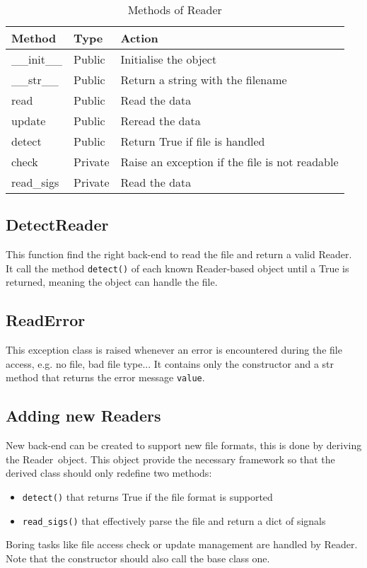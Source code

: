 \documentclass[a4paper,11pt]{article}
\newcommand{\att}[1]{\texttt{#1}}
\newcommand{\meth}[1]{\texttt{#1()}}
\newcommand{\cls}[1]{\textsf{#1}}
\newcommand{\rd}{\cls{Reader}}
\begin{document}
\begin{table}[htbp]
  \centering\sf\small
  \begin{tabular}{lll}
    \hline
    Method & Type & Action \\
    \hline
    \_\_init\_\_ & Public & Initialise the object \\
    \_\_str\_\_  & Public & Return a string with the filename\\
    read         & Public & Read the data\\
    update       & Public & Reread the data\\
    detect       & Public & Return True if file is handled\\
    check        & Private& Raise an exception if the file is not readable\\
    read\_sigs    & Private& Read the data \\
    \hline
  \end{tabular}
  \caption{Methods of \rd}
  \label{tab:rds:meth}
\end{table}

\subsection{DetectReader}
\label{sec:readers:detect}
This function find the right back-end to read the file and return a valid \rd.
It call the method \meth{detect} of each known \rd-based object until a True is returned, meaning the object can handle the file.

\subsection{ReadError}
\label{sec:readers:readerror}
This exception class is raised whenever an error is encountered during the file access, e.g. no file, bad file type...
It contains only the constructor and a str method that returns the error message \att{value}.

\subsection{Adding new Readers}
\label{sec:readers:add}
New back-end can be created to support new file formats, this is done by deriving the \rd\ object.
This object provide the necessary framework so that the derived class should only redefine two methods:
\begin{itemize}
\item \meth{detect} that returns True if the file format is supported
\item \meth{read\_sigs} that effectively parse the file and return a dict of signals
\end{itemize}
Boring tasks like file access check or update management are handled by \rd.
Note that the constructor should also call the base class one.
\end{document}
